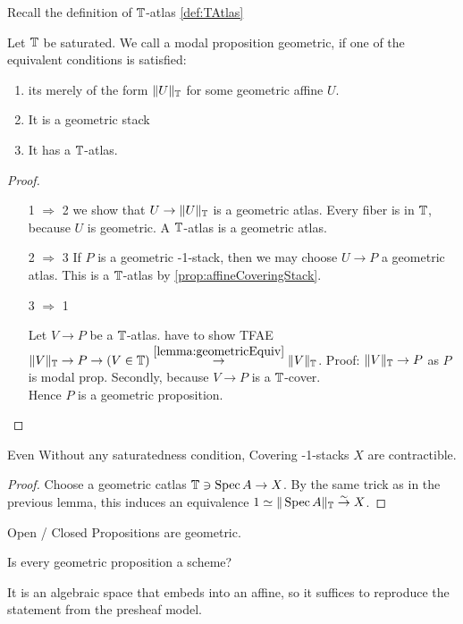 Recall the definition of $\mathbb{T}$-atlas \ref{def:TAtlas}
\begin{definition}{\label{def:algprop}}
	Let $\mathbb{T}$ be saturated. We call a modal proposition geometric, if one of the equivalent conditions is satisfied:
	\begin{enumerate}
		\item  its merely of the form $\|U\|_{\mathbb{T}}$ for some geometric affine $U$.
		\item It is a geometric stack
		\item It has a $\mathbb{T}$-atlas.

	\end{enumerate}
	
\end{definition}
\begin{proof} \
	\begin{enumerate}
		\item [1 $\Rightarrow$ 2]
		we show that $U \to \|U\|_{\mathbb{T}}$ is a geometric atlas. Every fiber is in $\mathbb{T}$, because $U$ is geometric. A $\mathbb{T}$-atlas is a geometric atlas.
		\item [2 $\Rightarrow$ 3]
		If $P$ is a geometric -1-stack, then we may choose $U \to P$ a geometric atlas. This is a $\mathbb{T}$-atlas by \ref{prop:affineCoveringStack}.

		\item [3 $\Rightarrow$ 1]
		
		Let $V \to P$ be a $\mathbb{T}$-atlas.
		have to show TFAE $\|V\|_{\mathbb{T}} \to P \to (V \in \mathbb{T}) \overset{\ref{lemma:geometricEquiv}}{\to} \|V\|_{\mathbb{T}}$. 
		Proof: $\|V\|_{\mathbb{T}} \to P$ as $P$ is modal prop. Secondly, because $V \to P$ is a $\mathbb{T}$-cover. \\
		Hence $P$ is a geometric proposition.
	\end{enumerate}
	
\end{proof}
\begin{lemma}{\label{lemma:covM1Stacks}}
	Even Without any saturatedness condition, Covering -1-stacks $X$ are contractible.
\end{lemma}
\begin{proof}
	Choose a geometric catlas $\mathbb{T} \ni \operatorname{Spec} A \to X$. By the same trick as in the previous lemma, this induces an equivalence $1 \simeq \|\operatorname{Spec} A\|_{\mathbb{T}} \overset{\sim}{\to} X$.
\end{proof}
\begin{example}
	Open / Closed Propositions are geometric.
\end{example}
\begin{question}
Is every geometric proposition a scheme?
\end{question}
It is an algebraic space that embeds into an affine, so it suffices to reproduce the statement from the presheaf model.

